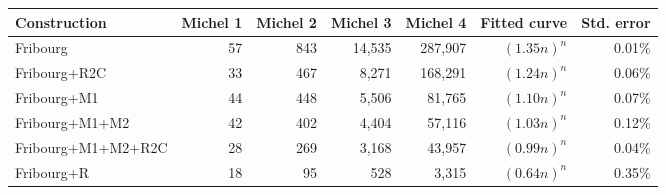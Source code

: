\begin{tabular}{lrrrrrr}
  \hline
Construction & Michel 1 & Michel 2 & Michel 3 & Michel 4 & Fitted curve & Std. error \\ 
  \hline
Fribourg & 57 & 843 & 14,535 & 287,907 & $(1.35n)^n$ & 0.01\% \\ 
  Fribourg+R2C & 33 & 467 & 8,271 & 168,291 & $(1.24n)^n$ & 0.06\% \\ 
  Fribourg+M1 & 44 & 448 & 5,506 & 81,765 & $(1.10n)^n$ & 0.07\% \\ 
  Fribourg+M1+M2 & 42 & 402 & 4,404 & 57,116 & $(1.03n)^n$ & 0.12\% \\ 
  Fribourg+M1+M2+R2C & 28 & 269 & 3,168 & 43,957 & $(0.99n)^n$ & 0.04\% \\ 
  Fribourg+R & 18 & 95 & 528 & 3,315 & $(0.64n)^n$ & 0.35\% \\ 
   \hline
\end{tabular}
